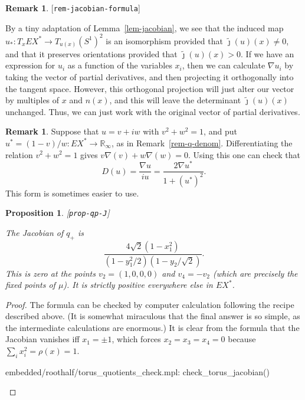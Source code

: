 \documentclass[reqno]{amsart}
\newcommand{\lbl}[1]{\label{#1}\textup{[\texttt{#1}]}\par}
\newcommand{\lbl}{\label}
\newcommand{\R}         {{\mathbb{R}}}
\newcommand{\rt}        {\sqrt{2}}
\newcommand{\tj}	{\widetilde{\jmath}}
\renewcommand{\:}{\colon}
\newtheorem{proposition}[theorem]{Proposition}
\theoremstyle{definition}
\newtheorem{remark}[theorem]{Remark}
\begin{document}
\begin{remark}\lbl{rem-jacobian-formula}
 By a tiny adaptation of Lemma~\ref{lem-jacobian}, we see that the
 induced map $u_*\:T_xEX^*\to T_{u(x)}(S^1)^2$ is an isomorphism
 provided that $\tj(u)(x)\neq 0$, and that it preserves orientations
 provided that $\tj(u)(x)>0$.  If we have an expression for $u_i$ as a
 function of the variables $x_i$, then we can calculate $\nabla u_i$
 by taking the vector of partial derivatives, and then projecting it
 orthogonally into the tangent space.  However, this orthogonal
 projection will just alter our vector by multiples of $x$ and $n(x)$,
 and this will leave the determinant $\tj(u)(x)$ unchanged.  Thus, we
 can just work with the original vector of partial derivatives.
\end{remark}

\begin{remark}
 Suppose that $u=v+iw$ with $v^2+w^2=1$, and put
 $u^*=(1-v)/w\:EX^*\to\R_\infty$, as in Remark~\ref{rem-q-denom}.
 Differentiating the relation $v^2+w^2=1$ gives
 $v\nabla(v)+w\nabla(w)=0$.  Using this one can check that
 \[ D(u) = \frac{\nabla u}{iu} =
     \frac{2\nabla u^*}{1+(u^*)^2}.
 \]
 This form is sometimes easier to use.
\end{remark}

\begin{proposition}\lbl{prop-qp-J}
 The Jacobian of $q_+$ is
 \[ \frac{4\rt(1-x_1^2)}{(1-y_1^2/2)(1-y_2/\rt)}. \]
 This is zero at the points $v_2=(1,0,0,0)$ and $v_4=-v_2$
 (which are precisely the fixed points of $\mu$).  It is strictly
 positive everywhere else in $EX^*$.
\end{proposition}
\begin{proof}
 The formula can be checked by computer calculation following the
 recipe described above.  (It is somewhat miraculous that the final
 answer is so simple, as the intermediate calculations are enormous.)
 It is clear from the formula that the Jacobian vanishes iff
 $x_1=\pm 1$, which forces $x_2=x_3=x_4=0$ because
 $\sum_ix_i^2=\rho(x)=1$.
 \begin{checks}
  embedded/roothalf/torus_quotients_check.mpl: check_torus_jacobian()
 \end{checks}
\end{proof}
\end{document}
